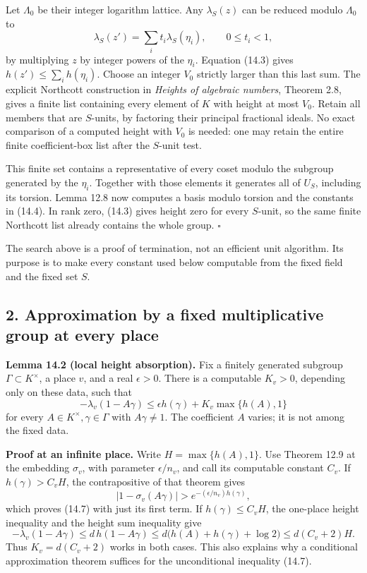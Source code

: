 \documentclass[
  11pt,
  a4paper,
]{article}
\begin{document}
Let \(\Lambda_0\) be their integer logarithm lattice. Any
\(\lambda_S(z)\) can be reduced modulo \(\Lambda_0\) to \[
\lambda_S(z')=\sum_i t_i\lambda_S(\eta_i),
\qquad 0\le t_i<1,
\tag{14.6}
\] by multiplying \(z\) by integer powers of the \(\eta_i\). Equation
(14.3) gives \(h(z')\le\sum_i h(\eta_i)\). Choose an integer \(V_0\)
strictly larger than this last sum. The explicit Northcott construction
in \emph{Heights of algebraic numbers}, Theorem 2.8, gives a finite list
containing every element of \(K\) with height at most \(V_0\). Retain
all members that are \(S\)-units, by factoring their principal
fractional ideals. No exact comparison of a computed height with \(V_0\)
is needed: one may retain the entire finite coefficient-box list after
the \(S\)-unit test.

This finite set contains a representative of every coset modulo the
subgroup generated by the \(\eta_i\). Together with those elements it
generates all of \(U_S\), including its torsion. Lemma 12.8 now computes
a basis modulo torsion and the constants in (14.4). In rank zero, (14.3)
gives height zero for every \(S\)-unit, so the same finite Northcott
list already contains the whole group. \(\square\)

The search above is a proof of termination, not an efficient unit
algorithm. Its purpose is to make every constant used below computable
from the fixed field and the fixed set \(S\).

\subsection{2. Approximation by a fixed multiplicative group at every
place}\label{approximation-by-a-fixed-multiplicative-group-at-every-place}

\textbf{Lemma 14.2 (local height absorption).} Fix a finitely generated
subgroup \(\Gamma\subset K^\times\), a place \(v\), and a real
\(\epsilon>0\). There is a computable \(K_v>0\), depending only on these
data, such that \[
-\lambda_v(1-A\gamma)
 \le \epsilon h(\gamma)+K_v\max\{h(A),1\}
\tag{14.7}
\] for every \(A\in K^\times,\gamma\in\Gamma\) with \(A\gamma\ne1\). The
coefficient \(A\) varies; it is not among the fixed data.

\textbf{Proof at an infinite place.} Write \(H=\max\{h(A),1\}\). Use
Theorem 12.9 at the embedding \(\sigma_v\), with parameter
\(\epsilon/n_v\), and call its computable constant \(C_v\). If
\(h(\gamma)>C_vH\), the contrapositive of that theorem gives \[
|1-\sigma_v(A\gamma)|>e^{-(\epsilon/n_v)h(\gamma)},
\] which proves (14.7) with just its first term. If
\(h(\gamma)\le C_vH\), the one-place height inequality and the height
sum inequality give \[
-\lambda_v(1-A\gamma)
 \le d\,h(1-A\gamma)
 \le d\bigl(h(A)+h(\gamma)+\log2\bigr)
 \le d(C_v+2)H.
\tag{14.8}
\] Thus \(K_v=d(C_v+2)\) works in both cases. This also explains why a
conditional approximation theorem suffices for the unconditional
inequality (14.7).
\end{document}
